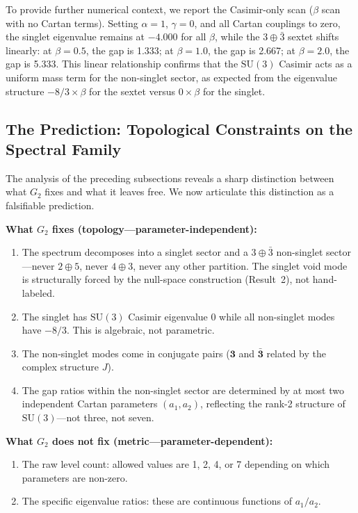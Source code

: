 \documentclass[12pt,a4paper]{article}
\begin{document}
To provide further numerical context, we report the Casimir-only scan ($\beta$ scan with no Cartan terms). Setting $\alpha = 1$, $\gamma = 0$, and all Cartan couplings to zero, the singlet eigenvalue remains at $-4.000$ for all $\beta$, while the $3 \oplus \bar{3}$ sextet shifts linearly: at $\beta = 0.5$, the gap is 1.333; at $\beta = 1.0$, the gap is 2.667; at $\beta = 2.0$, the gap is 5.333. This linear relationship confirms that the $\mathrm{SU}(3)$ Casimir acts as a uniform mass term for the non-singlet sector, as expected from the eigenvalue structure $-8/3 \times \beta$ for the sextet versus $0 \times \beta$ for the singlet.

\subsection{The Prediction: Topological Constraints on the Spectral Family}

The analysis of the preceding subsections reveals a sharp distinction between what $G_2$ fixes and what it leaves free. We now articulate this distinction as a falsifiable prediction.

\textbf{What $G_2$ fixes (topology---parameter-independent):}
\begin{enumerate}
\item[(i)] The spectrum decomposes into a singlet sector and a $3 \oplus \bar{3}$ non-singlet sector---never $2 \oplus 5$, never $4 \oplus 3$, never any other partition. The singlet void mode is structurally forced by the null-space construction (Result~2), not hand-labeled.
\item[(ii)] The singlet has $\mathrm{SU}(3)$ Casimir eigenvalue 0 while all non-singlet modes have $-8/3$. This is algebraic, not parametric.
\item[(iii)] The non-singlet modes come in conjugate pairs ($\mathbf{3}$ and $\bar{\mathbf{3}}$ related by the complex structure $J$).
\item[(iv)] The gap ratios within the non-singlet sector are determined by at most two independent Cartan parameters $(a_1, a_2)$, reflecting the rank-2 structure of $\mathrm{SU}(3)$---not three, not seven.
\end{enumerate}

\textbf{What $G_2$ does not fix (metric---parameter-dependent):}
\begin{enumerate}
\item[(v)] The raw level count: allowed values are 1, 2, 4, or 7 depending on which parameters are non-zero.
\item[(vi)] The specific eigenvalue ratios: these are continuous functions of $a_1/a_2$.
\end{enumerate}
\end{document}

